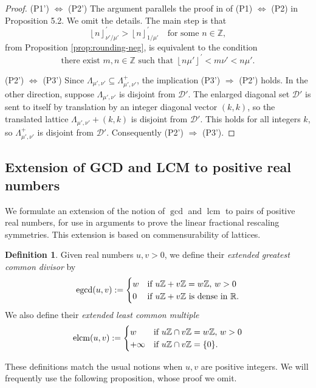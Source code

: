 \documentclass[11pt, letterpaper, reqno]{amsart}
\theoremstyle{definition}
\newtheorem{defi}[thm]{Definition}
\theoremstyle{remark}
\numberwithin{equation}{section}
\newcommand{\RR}{\ensuremath{\mathbb{R}}}
\newcommand{\ZZ}{\ensuremath{\mathbb{Z}}}
\newcommand{\sfloor}[1]{\left\lfloor{#1}\right\rfloor^{'}}
\newcommand{\uu}{{\mu'}}
\newcommand{\vv}{{\nu'}}
\newcommand{\cDprime}{{\mathcal{D}'}}
\newcommand{\egcd}{{\rm egcd}}
\newcommand{\elcm}{{\rm elcm}}
\DeclareMathOperator{\lcm}{lcm}
\begin{document}
\begin{proof}
(P1') $\Leftrightarrow$ (P2')
The argument parallels the proof in \cite{LagR:2018a}
of (P1) $\Leftrightarrow$ (P2) in Proposition 5.2.
We omit the details.
The main step is that
\begin{equation}\label{eq:rounding-neg2}
\sfloor{n}_{\vv/\uu} > \sfloor{n}_{1/\uu} \quad\text{for some }n\in\ZZ ,
\end{equation}
from Proposition \ref{prop:rounding-neg},
is equivalent to the condition
\begin{equation}\label{eq:disjoint-neg1}
\text{there exist } m, n \in \ZZ \text{ such that }  \sfloor{n\uu} < m\vv < {n\uu}.
\end{equation}

(P2') $\Leftrightarrow$ (P3')
Since $\Lambda_{\uu,\vv} \subseteq \Lambda^+_{\uu,\vv}$,
the implication (P3') $\Rightarrow$ (P2') holds.
In the other direction, suppose $\Lambda_{\uu,\vv}$ is disjoint from $\cDprime$.
The enlarged diagonal set $\cDprime$ is sent to itself by translation 
by an integer diagonal vector $(k,k)$,
so the translated lattice $\Lambda_{\uu,\vv} + (k,k)$ is disjoint from $\cDprime$.
This holds for all integers $k$, so
$\Lambda_{\uu,\vv}^+$ is disjoint from $\cDprime$.
Consequently (P2') $\Rightarrow$ (P3').
\end{proof}




\subsection{Extension of GCD and LCM to positive real numbers}
\label{subsubsec:rational-gcd}

We  formulate an extension of the notion of  $\gcd$ and $\lcm$ to pairs of 
positive real numbers, for use in arguments to prove the linear fractional 
rescaling symmetries.
This extension is based on  commensurability of lattices. 
 
\begin{defi}
Given real numbers $u, v>0$, we define their   {\em extended greatest common divisor} by
\[ \egcd(u,v)  := \begin{cases}
w &\text{if } u\ZZ + v\ZZ = w\ZZ, \, w > 0  \\
0 & \text{if } u\ZZ + v\ZZ \text{ is dense in }\RR.
\end{cases}\]
We also define their {\em extended least common multiple}
\[ \elcm(u,v)  := \begin{cases}
w &\text{if } u\ZZ \cap v\ZZ = w\ZZ, \, w > 0  \\
+\infty & \text{if } u\ZZ \cap v\ZZ  = \{0\}.
\end{cases}\]
\end{defi}
These definitions match the usual notions when $u,v$ are  positive integers. 
We will frequently use the  following proposition, whose
proof we omit.
\end{document}
